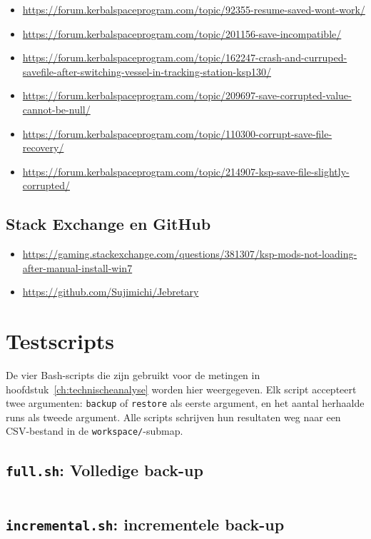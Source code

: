 \begin{itemize}
  \item \url{https://forum.kerbalspaceprogram.com/topic/92355-resume-saved-wont-work/}
  \item \url{https://forum.kerbalspaceprogram.com/topic/201156-save-incompatible/}
  \item \url{https://forum.kerbalspaceprogram.com/topic/162247-crash-and-curruped-savefile-after-switching-vessel-in-tracking-station-ksp130/}
  \item \url{https://forum.kerbalspaceprogram.com/topic/209697-save-corrupted-value-cannot-be-null/}
  \item \url{https://forum.kerbalspaceprogram.com/topic/110300-corrupt-save-file-recovery/}
  \item \url{https://forum.kerbalspaceprogram.com/topic/214907-ksp-save-file-slightly-corrupted/}
\end{itemize}

\section{Stack Exchange en GitHub}

\begin{itemize}
    \item \url{https://gaming.stackexchange.com/questions/381307/ksp-mods-not-loading-after-manual-install-win7}
    \item \url{https://github.com/Sujimichi/Jebretary}
\end{itemize}
\chapter{Testscripts}
\label{app:testscripts}

De vier Bash-scripts die zijn gebruikt voor de metingen in hoofdstuk~\ref{ch:technischeanalyse} worden hier weergegeven. Elk script accepteert twee argumenten: \texttt{backup} of \texttt{restore} als eerste argument, en het aantal herhaalde runs als tweede argument. Alle scripts schrijven hun resultaten weg naar een CSV-bestand in de \texttt{workspace/}-submap.

\section{\texttt{full.sh}: Volledige back-up}
\label{app:full-sh}

\inputminted[breakanywhere,fontsize=\small,frame=single]{bash}{scripts/full.sh}

\section{\texttt{incremental.sh}: incrementele back-up}
\label{app:incremental-sh}

